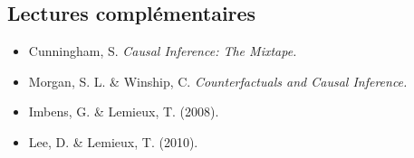 \documentclass[
  11pt,
]{article}
\providecommand{\tightlist}{%
  \setlength{\itemsep}{0pt}\setlength{\parskip}{0pt}}
\begin{document}
\subsection{Lectures complémentaires}\label{lectures-compluxe9mentaires}

\begin{itemize}
\tightlist
\item
  Cunningham, S. \emph{Causal Inference: The Mixtape.}
\item
  Morgan, S. L. \& Winship, C. \emph{Counterfactuals and Causal
  Inference.}
\item
  Imbens, G. \& Lemieux, T. (2008).
\item
  Lee, D. \& Lemieux, T. (2010).
\end{itemize}
\end{document}
